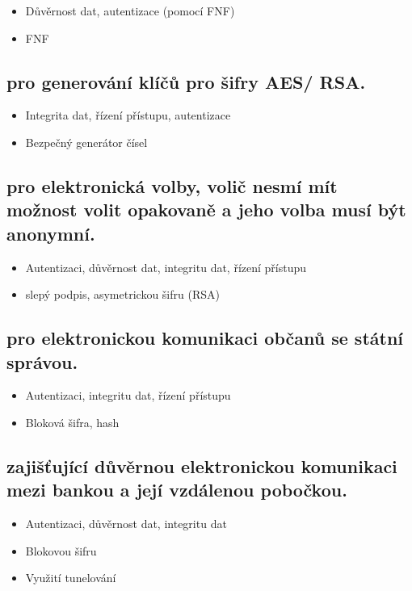 \begin{itemize}
    \item Důvěrnost dat, autentizace (pomocí FNF)
    \item FNF
\end{itemize}

\subsection{pro generování klíčů pro šifry AES/ RSA.}

\begin{itemize}
    \item Integrita dat, řízení přístupu, autentizace
    \item Bezpečný generátor čísel
\end{itemize}

\subsection{pro elektronická volby, volič nesmí mít možnost volit opakovaně a jeho volba musí být anonymní.}

\begin{itemize}
    \item Autentizaci, důvěrnost dat, integritu dat, řízení přístupu
    \item slepý podpis, asymetrickou šifru (RSA)
\end{itemize}


\subsection{pro elektronickou komunikaci občanů se státní správou.}

\begin{itemize}
    \item Autentizaci, integritu dat, řízení přístupu
    \item Bloková šifra, hash
\end{itemize}

\subsection{zajišťující důvěrnou elektronickou komunikaci mezi bankou a její vzdálenou pobočkou.}

\begin{itemize}
    \item Autentizaci, důvěrnost dat, integritu dat
    \item Blokovou šifru
    \item Využití tunelování
\end{itemize}
